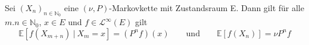 Sei $(X_{n})_{n \in \mathbb{N}_{0}}$  eine $(\nu,P)$-Markovkette mit Zustandsraum E. Dann gilt für alle $m.n \in \mathbb{N}_{0}$, $x \in E$ und $f \in \mathcal{L}^{\infty}(E) $ gilt
\begin{equation*}
\mathbb{E}[f(X_{m+n}) \: | \: X_{m} = x] = (P^{n}f)(x) \qquad \mathrm{und} \qquad \mathbb{E}[f(X_{n})] = \nu P^{n}f
\end{equation*}